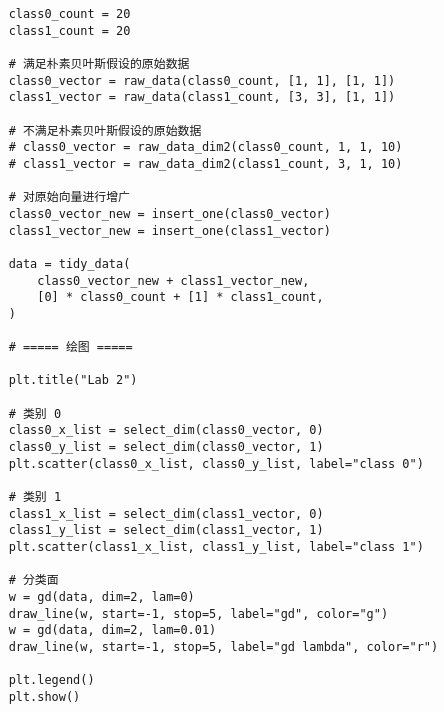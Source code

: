 \begin{verbatim}
    class0_count = 20
    class1_count = 20

    # 满足朴素贝叶斯假设的原始数据
    class0_vector = raw_data(class0_count, [1, 1], [1, 1])
    class1_vector = raw_data(class1_count, [3, 3], [1, 1])

    # 不满足朴素贝叶斯假设的原始数据
    # class0_vector = raw_data_dim2(class0_count, 1, 1, 10)
    # class1_vector = raw_data_dim2(class1_count, 3, 1, 10)

    # 对原始向量进行增广
    class0_vector_new = insert_one(class0_vector)
    class1_vector_new = insert_one(class1_vector)

    data = tidy_data(
        class0_vector_new + class1_vector_new,
        [0] * class0_count + [1] * class1_count,
    )

    # ===== 绘图 =====

    plt.title("Lab 2")

    # 类别 0
    class0_x_list = select_dim(class0_vector, 0)
    class0_y_list = select_dim(class0_vector, 1)
    plt.scatter(class0_x_list, class0_y_list, label="class 0")

    # 类别 1
    class1_x_list = select_dim(class1_vector, 0)
    class1_y_list = select_dim(class1_vector, 1)
    plt.scatter(class1_x_list, class1_y_list, label="class 1")

    # 分类面
    w = gd(data, dim=2, lam=0)
    draw_line(w, start=-1, stop=5, label="gd", color="g")
    w = gd(data, dim=2, lam=0.01)
    draw_line(w, start=-1, stop=5, label="gd lambda", color="r")

    plt.legend()
    plt.show()

\end{verbatim}
